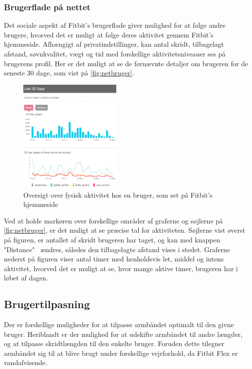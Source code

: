 \subsubsection{Brugerflade på nettet}

Det sociale aspekt af Fitbit's brugerflade giver mulighed for at følge andre brugere, hvorved det er muligt at følge deres aktivitet gennem Fitbit's hjemmeside. Afhængigt af privatindstillinger, kan antal skridt, tilbagelagt afstand, søvnkvalitet, vægt og tid med forskellige aktivitetsniveauer ses på brugerens profil. Her er det muligt at se de førnævnte detaljer om brugeren for de seneste $30$ dage, som vist på \autoref{fig:netbruger}.

\begin{figure}[H]
	\centering
	\includegraphics[width=0.45\textwidth]{figures/Netbruger}
	\caption{Oversigt over fysisk aktivitet hos en bruger, som set på Fitbit's hjemmeside}
	\label{fig:netbruger}
\end{figure}

Ved at holde markøren over forskellige områder af graferne og søjlerne på \autoref{fig:netbruger}, er det muligt at se præcise tal for aktiviteten. Søjlerne vist øverst på figuren, er antallet af skridt brugeren har taget, og kan med knappen "Distance"~ ændres, således den tilbagelagte afstand vises i stedet. Graferne nederst på figuren viser antal timer med henholdsvis let, middel og intens aktivitet, hvorved det er muligt at se, hvor mange aktive timer, brugeren har i løbet af dagen. 

\subsection{Brugertilpasning} \label{sec:brugertilpasning}
Der er forskellige muligheder for at tilpasse armbåndet optimalt til den givne bruger. Heriblandt er der mulighed for at udskifte armbåndet til andre længder, og at tilpasse skridtlængden til den enkelte bruger. Foruden dette tilegner armbåndet sig til at blive brugt under forskellige vejrforhold, da Fitbit Flex er vandafvisende. 

